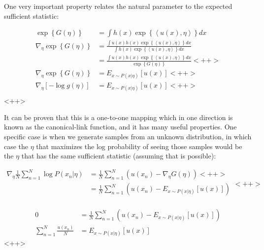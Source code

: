 \documentclass[a4paper]{article}
\begin{document}
One very important property relates the natural parameter to the expected sufficient statistic:

\begin{equation}
  \begin{split}
    \exp \left\{ G(\eta) \right\} &= \int h(x) \exp \left\{ \left< u(x), \eta \right> \right\} dx \\
    \nabla_{\eta} \exp \left\{ G(\eta) \right\} &= \frac{\int u(x) h(x) \exp \left\{ \left< u(x), \eta \right> \right\} dx}{\int h(x) \exp \left\{ \left< u(x), \eta \right> \right\} dx} \\
    &= \frac{\int u(x) h(x) \exp \left\{ \left< u(x), \eta \right> \right\} dx}{\exp\left\{ G(\eta) \right\}}<++> \\
    \nabla_{\eta} \exp \left\{ G(\eta) \right\} &= E_{x \sim P(x \vert \eta)} \left[ u(x) \right]<++> \\
    \nabla_{\eta} \left[ - \log g(\eta) \right] &= E_{x \sim P(x \vert \eta)} \left[ u(x) \right]<++> \\
  \end{split}
  \label{<++>}
\end{equation}<++>

It can be proven that this is a one-to-one mapping which in one direction is known as the canonical-link function, and it has many useful properties. 
One specific case is when we generate samples from an unknown distribution, in which case the $\eta$ that maximizes the log probability of seeing those samples would be the $\eta$ that has the same sufficient statistic (assuming that is possible):

\begin{equation}
  \begin{split}
    \nabla_{\eta} \frac{1}{N} \sum_{n=1}^N \log P( x_n \vert \eta ) &= \frac{1}{N} \sum_{n=1}^N \left( u(x_n) - \nabla_{\eta} G(\eta) \right) <++> \\
    &= \frac{1}{N} \sum_{n=1}^N \left( u(x_n) - E_{x \sim P(x \vert \eta)} \left[ u(x) \right] \right) \\
  \end{split}
  \label{}<++>
\end{equation}

\begin{equation}
  \begin{split}
    0 &= \frac{1}{N} \sum_{n=1}^N \left( u(x_n) - E_{x \sim P(x \vert \eta)} \left[ u(x) \right] \right) \\
    \sum_{n=1}^N \frac{u(x_n)}{N} &=  E_{x \sim P(x \vert \eta)} \left[ u(x) \right] 
  \end{split}
  \label{<++>}
\end{equation}<++>
\end{document}
